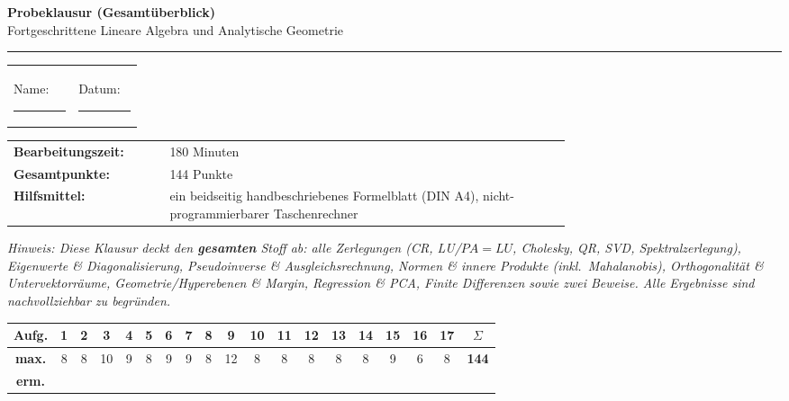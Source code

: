 \documentclass[a4paper,11pt]{article}
\begin{document}
\color{fg}

\thispagestyle{fancy}

\begin{center}
  {\color{accent}\LARGE\bfseries Probeklausur (Gesamtüberblick)}\\[0.3em]
  {\color{fg}\large Fortgeschrittene Lineare Algebra und Analytische Geometrie}\\[0.6em]
  {\color{gridcolor}\rule{\linewidth}{0.4pt}}
\end{center}

\vspace{0.4em}

\renewcommand{\arraystretch}{1.6}
\begin{tabular}{@{}p{0.5\linewidth}@{}p{0.5\linewidth}@{}}
  Name: \ \rule[-2pt]{0.7\linewidth}{0.4pt} &
  Datum: \ \rule[-2pt]{0.55\linewidth}{0.4pt}
\end{tabular}

\vspace{0.6em}

\begin{tabular}{@{}l p{0.72\linewidth}@{}}
  \textbf{\color{accent}Bearbeitungszeit:} & 180 Minuten \\
  \textbf{\color{accent}Gesamtpunkte:}     & 144 Punkte \\
  \textbf{\color{accent}Hilfsmittel:}      & ein beidseitig handbeschriebenes Formelblatt (DIN A4), nicht-programmierbarer Taschenrechner \\
\end{tabular}

\vspace{0.4em}

\textit{\color{fg}\small Hinweis: Diese Klausur deckt den \textbf{gesamten} Stoff ab: alle Zerlegungen (CR, LU/$PA{=}LU$, Cholesky, QR, SVD, Spektralzerlegung), Eigenwerte \& Diagonalisierung, Pseudoinverse \& Ausgleichsrechnung, Normen \& innere Produkte (inkl.\ Mahalanobis), Orthogonalität \& Untervektorräume, Geometrie/Hyperebenen \& Margin, Regression \& PCA, Finite Differenzen sowie zwei Beweise. Alle Ergebnisse sind nachvollziehbar zu begründen.}

\vspace{0.9em}

\renewcommand{\arraystretch}{1.5}
\noindent
\begin{tabular}{|c|*{17}{c|}c|}
\hline
\scriptsize\textbf{Aufg.} & 1 & 2 & 3 & 4 & 5 & 6 & 7 & 8 & 9 & 10 & 11 & 12 & 13 & 14 & 15 & 16 & 17 & \textbf{$\Sigma$} \\
\hline
\scriptsize\textbf{max.} & 8 & 8 & 10 & 9 & 8 & 9 & 9 & 8 & 12 & 8 & 8 & 8 & 8 & 8 & 9 & 6 & 8 & \textbf{144} \\
\hline
\scriptsize\textbf{erm.} & & & & & & & & & & & & & & & & & & \\
\hline
\end{tabular}
\end{document}
